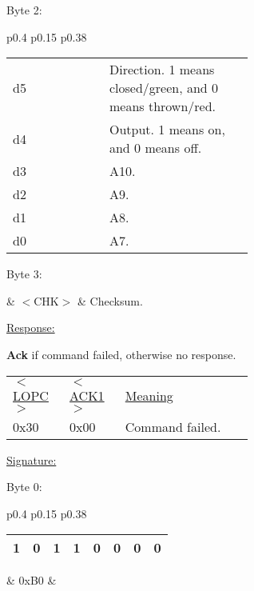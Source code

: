 Byte 2:

\begin{tabular}{p{0.4\linewidth} p{0.15\linewidth} p{0.38\linewidth}} 

\begin{tabular}{|p{0.3cm}|p{0.3cm}|p{0.3cm}|p{0.3cm}|p{0.3cm}|p{0.3cm}|p{0.3cm}|p{0.3cm}|}
\hline
0 & 0 & d5 & d4 & d3 & d2 & d1 & d0\\
\hline
\end{tabular}
& $<$SW2$>$ & Switch address A10 to A7 and switch control bits.\\
\end{tabular}

\begin{tabular}{p{0.05\linewidth} p{0.6\linewidth}} 
d5 & Direction. 1 means closed/green, and 0 means thrown/red.\\
d4 & Output. 1 means on, and 0 means off.\\
d3 & A10.\\
d2 & A9.\\
d1 & A8.\\
d0 & A7.\\
\end{tabular}

Byte 3:

& $<$CHK$>$ & Checksum.\\
\end{tabular}

\underline{Response:} 

\textbf{Ack} if command failed, otherwise no response.

\begin{tabular}{p{0.10\linewidth} p{0.10\linewidth} p{0.40\linewidth}}
\underline{$<$LOPC$>$} & \underline{$<$ACK1$>$} & \underline{Meaning}\\
0x30 & 0x00 & Command failed.\\
\end{tabular}

\underline{Signature:}

Byte 0:

\begin{tabular}{p{0.4\linewidth} p{0.15\linewidth} p{0.38\linewidth}} 

\begin{tabular}{|p{0.3cm}|p{0.3cm}|p{0.3cm}|p{0.3cm}|p{0.3cm}|p{0.3cm}|p{0.3cm}|p{0.3cm}|}
\hline
1 & 0 & 1 & 1 & 0 & 0 & 0 & 0\\
\hline
\end{tabular}
& 0xB0 & \\
\end{tabular}

